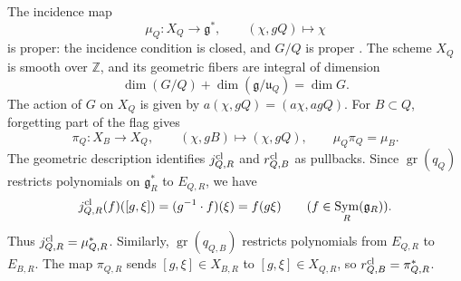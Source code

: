 \documentclass[twoside,a4paper,12pt,reqno]{amsart}
\theoremstyle{remark}
\numberwithin{equation}{section}
\newcommand{\Z}{\mathbb Z}
\newcommand{\fg}{\mathfrak g}
\newcommand{\fu}{\mathfrak u}
\DeclareMathOperator{\Sym}{Sym}
\DeclareMathOperator{\gr}{gr}
\begin{document}
The incidence map
\[
\mu_Q:X_Q\longrightarrow\fg^*,\qquad
(\chi,gQ)\longmapsto\chi
\]
is proper: the incidence condition is closed, and \(G/Q\) is proper
\cite[Cor.~5.2.8]{Conrad}.
The scheme \(X_Q\) is smooth over \(\Z\), and its geometric fibers
are integral of dimension
\[
\dim(G/Q)+\dim(\fg/\fu_Q)=\dim G.
\]
The action of \(G\) on \(X_Q\) is given by \(a(\chi,gQ)=(a\chi,agQ)\).
For \(B\subset Q\), forgetting part of the flag gives
\begin{equation}\label{eq:incidence-projections}
\pi_Q:X_B\longrightarrow X_Q,\qquad
(\chi,gB)\longmapsto(\chi,gQ),\qquad
\mu_Q\pi_Q=\mu_B.
\end{equation}
The geometric description identifies \(j^{\rm cl}_{Q,R}\) and \(r^{\rm cl}_{Q,B}\) as pullbacks.
Since \(\gr(q_Q)\) restricts polynomials on \(\fg_R^*\) to \(E_{Q,R}\),
we have
\[
j^{\rm cl}_{Q,R}(f)([g,\xi])=(g^{-1}\cdot f)(\xi)=f(g\xi)
\qquad(f\in\Sym_R(\fg_R)).
\]
Thus \(j^{\rm cl}_{Q,R}=\mu_{Q,R}^*\).
Similarly, \(\gr(q_{Q,B})\) restricts polynomials from \(E_{Q,R}\)
to \(E_{B,R}\). The map \(\pi_{Q,R}\) sends \([g,\xi]\in X_{B,R}\)
to \([g,\xi]\in X_{Q,R}\), so \(r^{\rm cl}_{Q,B}=\pi_{Q,R}^*\).
\end{document}
